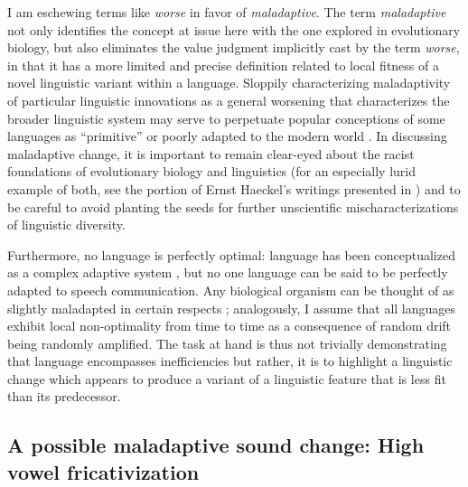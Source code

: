 \documentclass[output=paper,hidelinks]{langscibook}
\begin{document}
I am eschewing terms like \textit{worse} in favor of \textit{maladaptive}. The term \textit{maladaptive} not only identifies the concept at issue here with the one explored in evolutionary biology, but  also eliminates the value judgment implicitly cast by the term \textit{worse}, in that it has a more limited and precise definition related to local fitness of a novel linguistic variant within a language. Sloppily characterizing maladaptivity of particular linguistic innovations as a general worsening that characterizes the broader linguistic system may serve to perpetuate popular conceptions of some languages as ``primitive'' or poorly adapted to the modern world \citep{harlow-myth, evans-myth}. In discussing maladaptive change, it is important to remain clear-eyed about the racist foundations of evolutionary biology and linguistics (for an especially lurid example of both, see the portion of Ernst Haeckel's writings presented in \citealt{koerner}) and to be careful to avoid planting the seeds for further unscientific mischaracterizations of linguistic diversity.
%


Furthermore, no language is perfectly optimal: language has been conceptualized as a complex adaptive system \citep{gell-mann, lindblom-1995}, but no one language can be said to be perfectly adapted to speech communication. Any biological organism can be thought of as slightly maladapted in certain respects \citep{crespi}; analogously, I assume that all languages exhibit local non-optimality from time to time as a consequence of random drift being randomly amplified. The task at hand is thus not trivially demonstrating that language encompasses inefficiencies but rather, it is to highlight a linguistic change which appears to produce a variant of a linguistic feature that is less fit  than its predecessor.


\subsection{A possible maladaptive sound change: High vowel fricativization}
\end{document}
